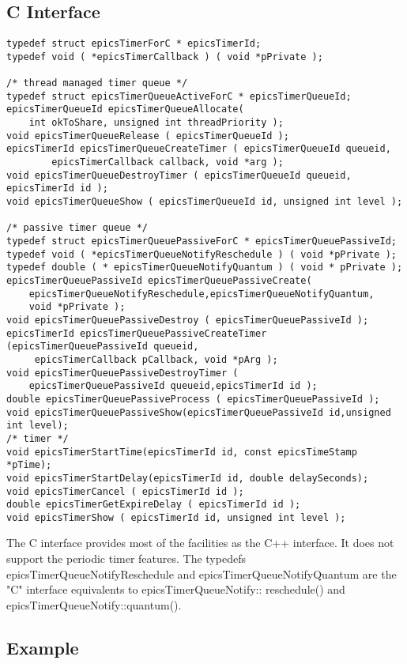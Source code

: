 \subsection{C Interface}

\begin{verbatim}typedef struct epicsTimerForC * epicsTimerId;
typedef void ( *epicsTimerCallback ) ( void *pPrivate );

/* thread managed timer queue */
typedef struct epicsTimerQueueActiveForC * epicsTimerQueueId;
epicsTimerQueueId epicsTimerQueueAllocate(
    int okToShare, unsigned int threadPriority );
void epicsTimerQueueRelease ( epicsTimerQueueId );
epicsTimerId epicsTimerQueueCreateTimer ( epicsTimerQueueId queueid,
        epicsTimerCallback callback, void *arg );
void epicsTimerQueueDestroyTimer ( epicsTimerQueueId queueid, epicsTimerId id );
void epicsTimerQueueShow ( epicsTimerQueueId id, unsigned int level );

/* passive timer queue */
typedef struct epicsTimerQueuePassiveForC * epicsTimerQueuePassiveId;
typedef void ( *epicsTimerQueueNotifyReschedule ) ( void *pPrivate );
typedef double ( * epicsTimerQueueNotifyQuantum ) ( void * pPrivate );
epicsTimerQueuePassiveId epicsTimerQueuePassiveCreate(
    epicsTimerQueueNotifyReschedule,epicsTimerQueueNotifyQuantum,
    void *pPrivate );
void epicsTimerQueuePassiveDestroy ( epicsTimerQueuePassiveId );
epicsTimerId epicsTimerQueuePassiveCreateTimer (epicsTimerQueuePassiveId queueid,
     epicsTimerCallback pCallback, void *pArg );
void epicsTimerQueuePassiveDestroyTimer (
    epicsTimerQueuePassiveId queueid,epicsTimerId id );
double epicsTimerQueuePassiveProcess ( epicsTimerQueuePassiveId );
void epicsTimerQueuePassiveShow(epicsTimerQueuePassiveId id,unsigned int level);
/* timer */
void epicsTimerStartTime(epicsTimerId id, const epicsTimeStamp *pTime);
void epicsTimerStartDelay(epicsTimerId id, double delaySeconds);
void epicsTimerCancel ( epicsTimerId id );
double epicsTimerGetExpireDelay ( epicsTimerId id );
void epicsTimerShow ( epicsTimerId id, unsigned int level );
\end{verbatim}The C interface provides most of the facilities as the C++ interface. It does not support the periodic timer features. The 
typedefs epicsTimerQueueNotifyReschedule and epicsTimerQueueNotifyQuantum are the "C" interface equivalents to 
epicsTimerQueueNotify:: reschedule() and epicsTimerQueueNotify::quantum().

\subsection{Example}

